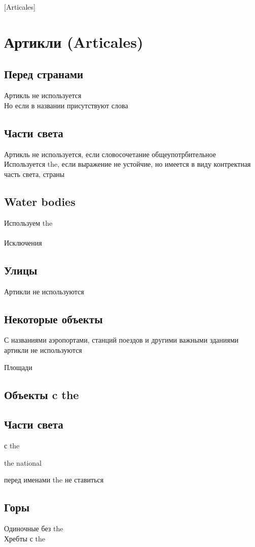 [Articales]

\section{Артикли (Articales)}
\subsection{Перед странами}
\p
Артикль не используется\\
Но если в названии присутствуют слова \\

\subsection{Части света}
\p
Артикль не используется, если словосочетание общеупотрбительное\\
Используется the, если выражение не устойчие, но имеется в виду контректная часть света, страны\\

\subsection{Water bodies}
\p
Используем the\\
\\
Исключения\\

\subsection{Улицы}
\p
Артикли не используются\\

\subsection{Некоторые объекты}
\p
С названиями аэропортами, станций поездов и другими важными зданиями
артикли не используются

Площади

\subsection{Объекты c the}

\subsection{Части света}
с the

the national

перед именами the не ставиться

\subsection{Горы}
\p
Одиночные без the\\
Хребты с the
